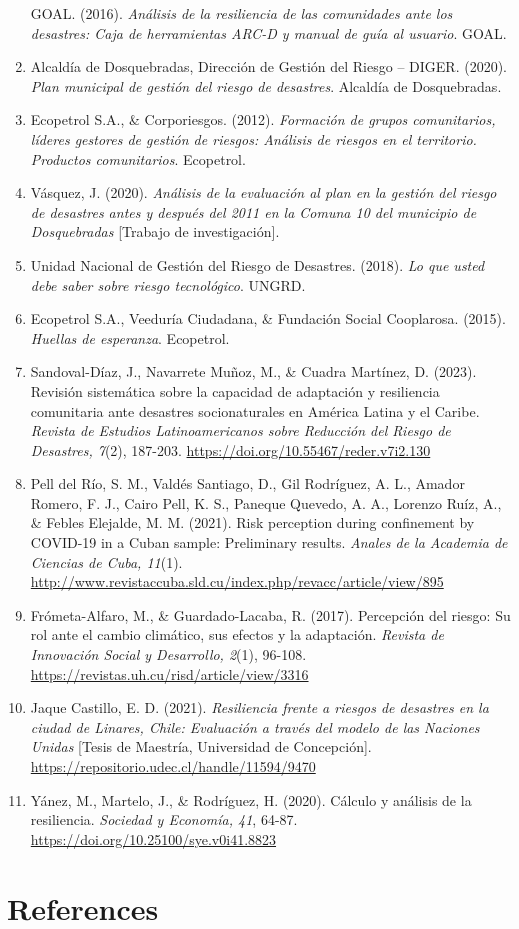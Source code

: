 \documentclass[
  letterpaper,
]{book}
\begin{document}
\begin{enumerate}
  GOAL. (2016). \emph{Análisis de la resiliencia de las comunidades ante
  los desastres: Caja de herramientas ARC-D y manual de guía al
  usuario}. GOAL.
\item
  Alcaldía de Dosquebradas, Dirección de Gestión del Riesgo -- DIGER.
  (2020). \emph{Plan municipal de gestión del riesgo de desastres}.
  Alcaldía de Dosquebradas.
\item
  Ecopetrol S.A., \& Corporiesgos. (2012). \emph{Formación de grupos
  comunitarios, líderes gestores de gestión de riesgos: Análisis de
  riesgos en el territorio. Productos comunitarios}. Ecopetrol.
\item
  Vásquez, J. (2020). \emph{Análisis de la evaluación al plan en la
  gestión del riesgo de desastres antes y después del 2011 en la Comuna
  10 del municipio de Dosquebradas} {[}Trabajo de investigación{]}.
\item
  Unidad Nacional de Gestión del Riesgo de Desastres. (2018). \emph{Lo
  que usted debe saber sobre riesgo tecnológico}. UNGRD.
\item
  Ecopetrol S.A., Veeduría Ciudadana, \& Fundación Social Cooplarosa.
  (2015). \emph{Huellas de esperanza}. Ecopetrol.
\item
  Sandoval-Díaz, J., Navarrete Muñoz, M., \& Cuadra Martínez, D. (2023).
  Revisión sistemática sobre la capacidad de adaptación y resiliencia
  comunitaria ante desastres socionaturales en América Latina y el
  Caribe. \emph{Revista de Estudios Latinoamericanos sobre Reducción del
  Riesgo de Desastres, 7}(2), 187-203.
  \url{https://doi.org/10.55467/reder.v7i2.130}
\item
  Pell del Río, S. M., Valdés Santiago, D., Gil Rodríguez, A. L., Amador
  Romero, F. J., Cairo Pell, K. S., Paneque Quevedo, A. A., Lorenzo
  Ruíz, A., \& Febles Elejalde, M. M. (2021). Risk perception during
  confinement by COVID-19 in a Cuban sample: Preliminary results.
  \emph{Anales de la Academia de Ciencias de Cuba, 11}(1).
  \url{http://www.revistaccuba.sld.cu/index.php/revacc/article/view/895}
\item
  Frómeta-Alfaro, M., \& Guardado-Lacaba, R. (2017). Percepción del
  riesgo: Su rol ante el cambio climático, sus efectos y la adaptación.
  \emph{Revista de Innovación Social y Desarrollo, 2}(1), 96-108.
  \url{https://revistas.uh.cu/risd/article/view/3316}
\item
  Jaque Castillo, E. D. (2021). \emph{Resiliencia frente a riesgos de
  desastres en la ciudad de Linares, Chile: Evaluación a través del
  modelo de las Naciones Unidas} {[}Tesis de Maestría, Universidad de
  Concepción{]}. \url{https://repositorio.udec.cl/handle/11594/9470}
\item
  Yánez, M., Martelo, J., \& Rodríguez, H. (2020). Cálculo y análisis de
  la resiliencia. \emph{Sociedad y Economía, 41}, 64-87.
  \url{https://doi.org/10.25100/sye.v0i41.8823}
\end{enumerate}


\chapter*{References}\label{references}


\label{refs}


\backmatter
\end{document}
